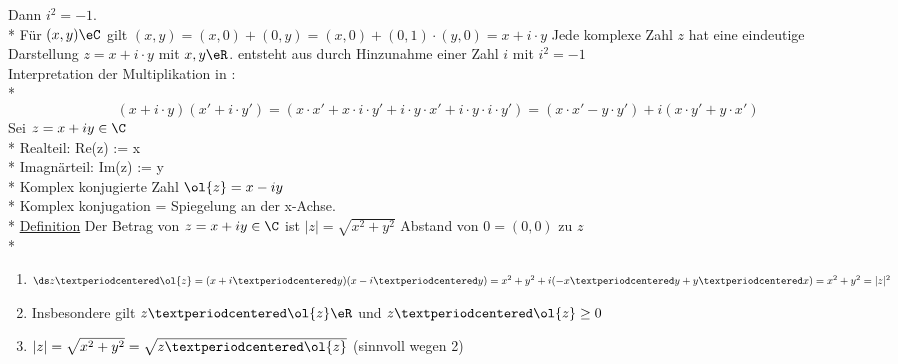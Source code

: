 Dann $i^2=-1$.\\*
Für $(x,y)\eC$ gilt $(x,y)=(x,0)+(0,y)=(x,0)+(0,1)·(y,0)=x+i·y$
Jede komplexe Zahl $z$ hat eine eindeutige Darstellung $z=x+i·y$ mit $x,y\eR$.
\C{} entsteht aus \R{} durch Hinzunahme einer Zahl $i$ mit $i^2=-1$\\
Interpretation der Multiplikation in \C:\\*
$$(x+i·y)(x'+i·y')=(x·x'+x·i·y'+i·y·x'+i·y·i·y')=(x·x'-y·y')+i(x·y'+y·x')$$
Sei $z = x + iy \in \C$\\*
Realteil: Re(z) := x \\*
Imagnärteil: Im(z) := y\\*
Komplex konjugierte Zahl $\ol{z} = x - iy$\\*
Komplex konjugation = Spiegelung an der x-Achse.\\*
\ul{Definition} Der Betrag von $z = x + iy \in \C$ ist $|z| = \sqrt{x^2 + y^2}$ Abstand von $0 = (0, 0)$ zu $z$\\*
\bem
\begin{enumerate}
\item{$\ds z·\ol{z}=(x+i·y)(x-i·y)=x^2+y^2+i(-x·y+y·x)=x^2+y^2=|z|^2$}
\item{Insbesondere gilt $z·\ol{z}\eR$ und $z·\ol{z}\geq 0$}
\item{$|z|=\sqrt{x^2+y^2}=\sqrt{z·\ol{z}}$ (sinnvoll wegen 2)}
\end{enumerate}